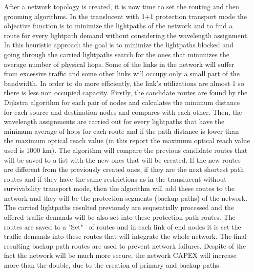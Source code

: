 \vspace{11pt}
After a network topology is created, it is now time to set the routing and then grooming algorithms. In the translucent with 1+1 protection transport mode the objective function is to minimize the lightpaths of the network and to find a route for every lightpath demand without considering the wavelength assignment. In this heuristic approach the goal is to minimize the lightpaths blocked and going through the carried lightpaths search for the ones that minimizes the average number of physical hops. Some of the links in the network will suffer from excessive traffic and some other links will occupy only a small part of the bandwidth. In order to do more efficiently, the link's utilizations are almost 1 so there is less non occupied capacity. Firstly, the candidate routes are found by the Dijkstra algorithm for each pair of nodes and calculates the minimum distance for each source and destination nodes and compares with each other. Then, the wavelength assignments are carried out for every lightpaths that have the minimum average of hops for each route and if the path distance is lower than the maximum optical reach value (in this report the maximum optical reach value used is 1000 km).
The algorithm will compare the previous candidate routes that will be saved to a list with the new ones that will be created. If the new routes are different from the previously created ones, if they are the next shortest path routes and if they have the same restrictions as in the translucent without survivability transport mode, then the algorithm will add these routes to the network and they will be the protection segments (backup paths) of the network. The carried lightpaths resulted previously are sequentially processed and the offered traffic demands will be also set into these protection path routes. The routes are saved to a "Set" \ of routes and in each link of end nodes it is set the traffic demands into these routes that will integrate the whole network. The final resulting backup path routes are used to prevent network failures. Despite of the fact the network will be much more secure, the network CAPEX will increase more than the double, due to the creation of primary and backup paths.

